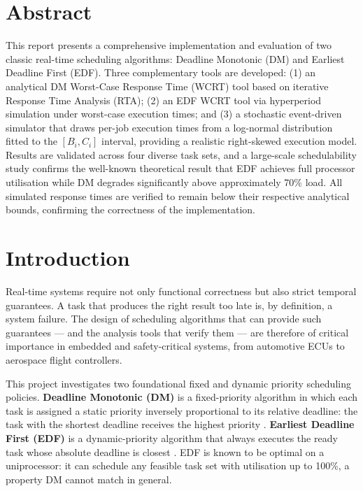 \documentclass[12pt,a4paper]{article}
\begin{document}
\section*{Abstract}
This report presents a comprehensive implementation and evaluation of two classic real-time scheduling algorithms: Deadline Monotonic (DM) and Earliest Deadline First (EDF). Three complementary tools are developed: (1) an analytical DM Worst-Case Response Time (WCRT) tool based on iterative Response Time Analysis (RTA); (2) an EDF WCRT tool via hyperperiod simulation under worst-case execution times; and (3) a stochastic event-driven simulator that draws per-job execution times from a log-normal distribution fitted to the \([B_i, C_i]\) interval, providing a realistic right-skewed execution model. Results are validated across four diverse task sets, and a large-scale schedulability study confirms the well-known theoretical result that EDF achieves full processor utilisation while DM degrades significantly above approximately 70\% load. All simulated response times are verified to remain below their respective analytical bounds, confirming the correctness of the implementation.

\section{Introduction}

Real-time systems require not only functional correctness but also strict temporal guarantees. A task that produces the right result too late is, by definition, a system failure. The design of scheduling algorithms that can provide such guarantees --- and the analysis tools that verify them --- are therefore of critical importance in embedded and safety-critical systems, from automotive ECUs to aerospace flight controllers.

This project investigates two foundational fixed and dynamic priority scheduling policies. \textbf{Deadline Monotonic (DM)} is a fixed-priority algorithm in which each task is assigned a static priority inversely proportional to its relative deadline: the task with the shortest deadline receives the highest priority \cite{leung1982}. \textbf{Earliest Deadline First (EDF)} is a dynamic-priority algorithm that always executes the ready task whose absolute deadline is closest \cite{liu1973}. EDF is known to be optimal on a uniprocessor: it can schedule any feasible task set with utilisation up to 100\%, a property DM cannot match in general.
\end{document}
